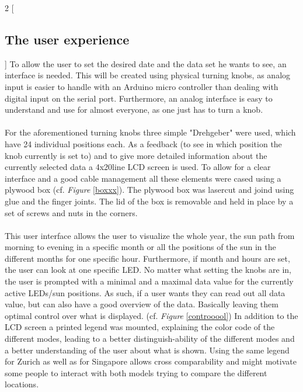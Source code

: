 \documentclass[a4paper,9pt]{article}
\begin{document}
\newpage
 \begin{multicols}{2}
 [
      \subsection{The user experience}
      \label{box}
 ]
 To allow the user to set the desired date and the data set he wants to see, an interface is needed. This will be created using physical turning knobs, as analog input is easier to handle with an Arduino micro controller than dealing with digital input on the serial port. Furthermore, an analog interface is easy to understand and use for almost everyone, as one just has to turn a knob.\\
 \\
 For the aforementioned turning knobs three simple "Drehgeber" were used, which have 24 individual positions each. As a feedback (to see in which position the knob currently is set to) and to give more detailed information about the currently selected data a 4x20line LCD screen is used. To allow for a clear interface and a good cable management all these elements were cased using a plywood box (cf. \textit{Figure} \ref{boxxx}). The plywood box was lasercut and joind using glue and the finger joints. The lid of the box is removable and held in place by a set of screws and nuts in the corners.\\
 \\[.5cm]
 This user interface allows the user to visualize the whole year, the sun path from morning to evening in a specific month or all the positions of the sun in the different months for one specific hour. Furthermore, if month and hours are set, the user can look at one specific LED. No matter what setting the knobs are in, the user is prompted with a minimal and a maximal data value for the currently active LEDs/sun positions. As such, if a user wants they can read out all data value, but can also have a good overview of the data. Basically leaving them optimal control over what is displayed. (cf. \textit{Figure} \ref{controoool}) In addition to the LCD screen a printed legend was mounted, explaining the color code of the different modes, leading to a better distinguish-ability of the different modes and a better understanding of the user about what is shown. Using the same legend for Zurich as well as for Singapore allows cross comparability and might motivate some people to interact with both models trying to compare the different locations.
 \end{multicols}
\end{document}
